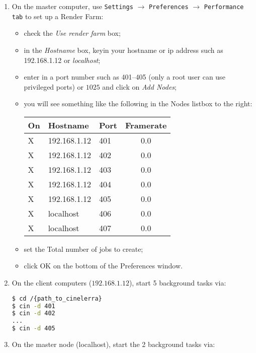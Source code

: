 \begin{enumerate}
    \item On the master computer, use \texttt{Settings} $\rightarrow$ \texttt{Preferences} $\rightarrow$ \texttt{Performance} \texttt{tab} to set up a Render Farm:
    \begin{itemize}
        \item check the \textit{Use render farm} box;
        \item in the \textit{Hostname} box, keyin your hostname or ip address such as 192.168.1.12 or \textit{localhost};
        \item enter in a port number such as 401--405 (only a root user can use privileged ports) or $1025$  and click on \textit{Add Nodes};
        \item you will see something like the following in the Nodes listbox to the right:\newline
            \begin{tabular}{lllc}
                On & Hostname     & Port & Framerate \\\midrule
                X  & 192.168.1.12 & 401  & 0.0       \\
                X  & 192.168.1.12 & 402  & 0.0       \\
                X  & 192.168.1.12 & 403  & 0.0       \\
                X  & 192.168.1.12 & 404  & 0.0       \\
                X  & 192.168.1.12 & 405  & 0.0       \\
                X  & localhost    & 406  & 0.0       \\
                X  & localhost    & 407  & 0.0       \\
            \end{tabular}
        \item set the Total number of jobs to create;
        \item click OK on the bottom of the Preferences window.
    \end{itemize}
    \item On the client computers ($192.168.1.12$), start 5 background \CGG{} tasks via:
    \begin{lstlisting}[language=bash,numbers=none]
$ cd /{path_to_cinelerra}
$ cin -d 401
$ cin -d 402 
...
$ cin -d 405
    \end{lstlisting}
    \item On the master node (localhost), start the 2 background \CGG{} tasks via:
    \begin{lstlisting}[language=bash,numbers=none]

\end{lstlisting}
\end{enumerate}
